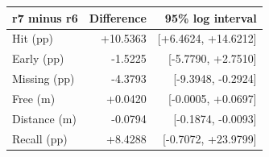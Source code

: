 \begin{tabular}{lrr}
\toprule
r7 minus r6 & Difference & 95\% log interval \\
\midrule
Hit (pp) & +10.5363 & [+6.4624, +14.6212] \\
Early (pp) & -1.5225 & [-5.7790, +2.7510] \\
Missing (pp) & -4.3793 & [-9.3948, -0.2924] \\
Free (m) & +0.0420 & [-0.0005, +0.0697] \\
Distance (m) & -0.0794 & [-0.1874, -0.0093] \\
Recall (pp) & +8.4288 & [-0.7072, +23.9799] \\
\bottomrule
\end{tabular}
